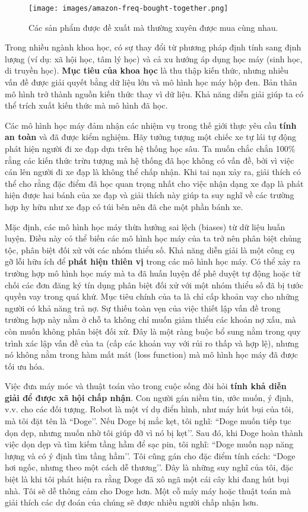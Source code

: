 \begin{figure*}[h!]
	\centering
	\texttt{[image: images/amazon-freq-bought-together.png]}
	\caption{Các sản phẩm được đề xuất mà thường xuyên được mua cùng nhau.}
\end{figure*}

Trong nhiều ngành khoa học, có sự thay đổi từ phương pháp định tính sang định lượng (ví dụ: xã hội học, tâm lý học) và cả xu hướng áp dụng học máy (sinh học, di truyền học). \textbf{Mục tiêu của khoa học} là thu thập kiến thức, nhưng nhiều vấn đề được giải quyết bằng dữ liệu lớn và mô hình học máy hộp đen. Bản thân mô hình trở thành nguồn kiến thức thay vì dữ liệu. Khả năng diễn giải giúp ta có thể trích xuất kiến thức mà mô hình đã học.

Các mô hình học máy đảm nhận các nhiệm vụ trong thế giới thực yêu cầu \textbf{tính an toàn} và đã được kiểm nghiệm. Hãy tưởng tượng một chiếc xe tự lái tự động phát hiện người đi xe đạp dựa trên hệ thống học sâu. Ta muốn chắc chắn 100\% rằng các kiến thức trừu tượng mà hệ thống đã học không có vấn đề, bởi vì việc cán lên người đi xe đạp là không thể chấp nhận. Khi tai nạn xảy ra, giải thích có thể cho rằng đặc điểm đã học quan trọng nhất cho việc nhận dạng xe đạp là phát hiện được hai bánh của xe đạp và giải thích này giúp ta suy nghĩ về các trường hợp hy hữu như xe đạp có túi bên nên đã che một phần bánh xe.

Mặc định, các mô hình học máy thừa hưởng sai lệch (biases) từ dữ liệu huấn luyện. Điều này có thể biến các mô hình học máy của ta trở nên phân biệt chủng tộc, phân biệt đối xử với các nhóm thiểu số. Khả năng diễn giải là một công cụ gỡ lỗi hữu ích để \textbf{phát hiện thiên vị}  trong các mô hình học máy. Có thể xảy ra trường hợp mô hình học máy mà ta đã huấn luyện để phê duyệt tự động hoặc từ chối các đơn đăng ký tín dụng phân biệt đối xử với một nhóm thiểu số đã bị tước quyền vay trong quá khứ. Mục tiêu chính của ta là chỉ cấp khoản vay cho những người có khả năng trả nợ. Sự thiếu toàn vẹn của việc thiết lập vấn đề trong trường hợp này nằm ở chỗ ta không chỉ muốn giảm thiểu các khoản nợ xấu, mà còn muốn không phân biệt đối xử. Đây là một ràng buộc bổ sung nằm trong quy trình xác lập vấn đề của ta (cấp các khoản vay với rủi ro thấp và hợp lệ), nhưng nó không nằm trong hàm mất mát (loss function) mà mô hình học máy đã được tối ưu hóa.

Việc đưa máy móc và thuật toán vào trong cuộc sống đòi hỏi \textbf{tính khả diễn giải để được xã hội chấp nhận}.  Con người gán niềm tin, ước muốn, ý định, v.v. cho các đối tượng. Robot là một ví dụ điển hình, như máy hút bụi của tôi, mà tôi đặt tên là ``Doge’’. Nếu Doge bị mắc kẹt, tôi nghĩ: ``Doge muốn tiếp tục dọn dẹp, nhưng muốn nhờ tôi giúp đỡ vì nó bị kẹt’’. Sau đó, khi Doge hoàn thành việc dọn dẹp và tìm kiếm tầng hầm để sạc pin, tôi nghĩ: ``Doge muốn nạp năng lượng và có ý định tìm tầng hầm’’. Tôi cũng gán cho đặc điểm tính cách: ``Doge hơi ngốc, nhưng theo một cách dễ thương’’. Đây là những suy nghĩ của tôi, đặc biệt là khi tôi phát hiện ra rằng Doge đã xô ngã một cái cây khi đang hút bụi nhà. Tôi sẽ dễ thông cảm cho Doge hơn. Một cỗ máy máy hoặc thuật toán mà giải thích các dự đoán của chúng sẽ được nhiều người chấp nhận hơn. 

